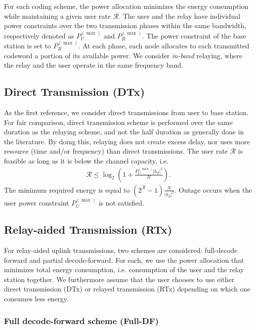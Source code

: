 \documentclass[journal]{IEEEtran}
\theoremstyle{definition}
\begin{document}
For each coding scheme, the power allocation minimizes the energy consumption while maintaining a given user rate $\mathcal{R}$.
The user and the relay have individual power constraints over the two transmission phases within the same bandwidth, respectively denoted as $P_U^{(\max)}$ and $P_R^{(\max)}$. The power constraint of the base station is set to $P_B^{(\max)}$. At each phase, each node allocates to each transmitted codeword a portion of its available power. We consider \textit{in-band} relaying, where the relay and the user operate in the same frequency band.

\subsection{Direct Transmission (DTx)}

As the first reference, we consider direct transmissions from user to base station. For fair comparison, direct transmission scheme is performed over the same duration as the relaying scheme, and not the half duration as generally done in the literature. By doing this, relaying does not create excess delay, nor uses more resource (time and/or frequency) than direct transmissions.
The user rate $\mathcal{R}$ is feasible as long as it is below the channel capacity, i.e.
\begin{align*}
\mathcal{R} \leq \log_2 \left( 1+ \frac{P_U^{(\max)} \vert h_d\vert^2}{N}\right) .
\end{align*}
The minimum required energy is equal to $\left( 2^\mathcal{R } - 1\right) \frac{N}{\vert h_d\vert^2}$. Outage occurs when the user power constraint $P_U^{(\max)}$ is not satisfied.

\subsection{Relay-aided Transmission (RTx)}

For relay-aided uplink transmissions, two schemes are considered: full-decode forward and partial decode-forward. For each, we use the power allocation that minimizes total energy consumption, i.e. consumption of the user and the relay station together. We furthermore assume that the user chooses to use either direct transmission (DTx) or relayed transmission (RTx) depending on which one consumes less energy.

\subsubsection{Full decode-forward scheme (Full-DF)}
\label{sec:two-hop}
\end{document}
